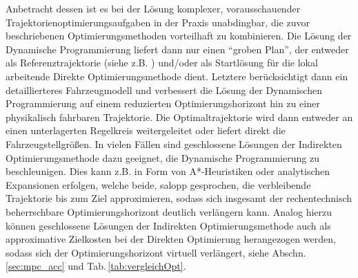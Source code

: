 Anbetracht dessen ist es bei der Lösung komplexer, vorausschauender Trajektorienoptimierungsaufgaben in der Praxis unabdingbar, die zuvor beschriebenen Optimierungsmethoden vorteilhaft zu kombinieren. Die Lösung der Dynamische Programmierung liefert dann nur einen "`groben Plan"', der entweder als Referenztrajektorie (siehe z.B. \cite{Ferguson2008, Ferguson2008b, gu2013focused}) und/oder als Startlösung für die lokal arbeitende Direkte Optimierungsmethode dient. Letztere berücksichtigt dann ein detaillierteres Fahrzeugmodell und verbessert die Lösung der Dynamischen Programmierung auf einem reduzierten Optimierungshorizont hin zu einer physikalisch fahrbaren Trajektorie. Die Optimaltrajektorie wird dann entweder an einen unterlagerten Regelkreis weitergeleitet oder liefert direkt die Fahrzeugstellgrößen.
In vielen Fällen sind geschlossene Lösungen der Indirekten Optimierungsmethode dazu geeignet, die Dynamische Programmierung zu beschleunigen. Dies kann z.B. in Form von A*-Heuristiken \cite{zieglerIV08} oder analytischen Expansionen \cite{dolgov2010path} erfolgen, welche beide, salopp gesprochen, die verbleibende Trajektorie bis zum Ziel approximieren, sodass sich insgesamt der rechentechnisch beherrschbare Optimierungshorizont deutlich verlängern kann. Analog hierzu können geschlossene Lösungen der Indirekten Optimierungsmethode auch als approximative Zielkosten bei der Direkten Optimierung herangezogen werden, sodass sich der Optimierungshorizont virtuell verlängert, siehe Abschn.\,\ref{sec:mpc_acc} und Tab.\,\ref{tab:vergleichOpt}.

\begin{center}
\begin{table}[h]
\noindent
{}
\caption{Optimierungsmethoden und deren Kombination im direkten Vergleich}
\label{tab:vergleichOpt}
\end{table}
\end{center}

